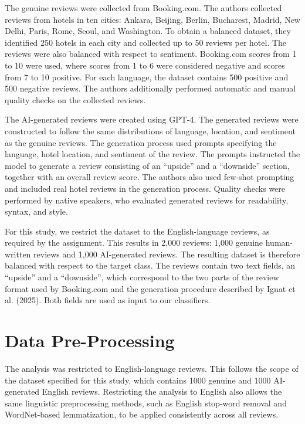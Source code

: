 \documentclass{article}
\begin{document}
The genuine reviews were collected from Booking.com. The authors collected reviews from hotels in ten cities: Ankara, Beijing, Berlin, Bucharest, Madrid, New Delhi, Paris, Rome, Seoul, and Washington. To obtain a balanced dataset, they identified 250 hotels in each city and collected up to 50 reviews per hotel. The reviews were also balanced with respect to sentiment. Booking.com scores from 1 to 10 were used, where scores from 1 to 6 were considered negative and scores from 7 to 10 positive. For each language, the dataset contains 500 positive and 500 negative reviews. The authors additionally performed automatic and manual quality checks on the collected reviews. \cite{ignat-etal-2025-maide}

The AI-generated reviews were created using GPT-4. The generated reviews were constructed to follow the same distributions of language, location, and sentiment as the genuine reviews. The generation process used prompts specifying the language, hotel location, and sentiment of the review. The prompts instructed the model to generate a review consisting of an ``upside'' and a ``downside'' section, together with an overall review score. The authors also used few-shot prompting and included real hotel reviews in the generation process. Quality checks were performed by native speakers, who evaluated generated reviews for readability, syntax, and style. \cite{ignat-etal-2025-maide}

For this study, we restrict the dataset to the English-language reviews, as required by the assignment. This results in 2,000 reviews: 1,000 genuine human-written reviews and 1,000 AI-generated reviews. The resulting dataset is therefore balanced with respect to the target class. The reviews contain two text fields, an ``upside'' and a ``downside'', which correspond to the two parts of the review format used by Booking.com and the generation procedure described by Ignat et al. (2025). Both fields are used as input to our classifiers.

\section{Data Pre-Processing}
The analysis was restricted to English-language reviews. This follows the scope of the dataset specified for this study, which contains 1000 genuine and 1000 AI-generated English reviews. Restricting the analysis to English also allows the same linguistic preprocessing methods, such as English stop-word removal and WordNet-based lemmatization, to be applied consistently across all reviews. 
\end{document}
